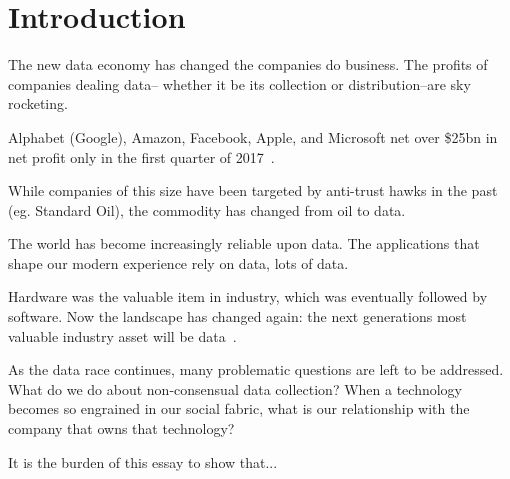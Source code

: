 \section{Introduction}

The new data economy has changed the companies do business. The profits of
companies dealing data-- whether it be its collection or distribution--are sky
rocketing.

Alphabet (Google), Amazon, Facebook, Apple, and Microsoft net over \$25bn in
net profit only in the first quarter of 2017~\cite{economist2017}.

While companies of this size have been targeted by anti-trust hawks in the past
(eg. Standard Oil), the commodity has changed from oil to data.

The world has become increasingly reliable upon data. The applications that
shape our modern experience rely on data, lots of data.

Hardware was the valuable item in industry, which was eventually followed by
software. Now the landscape has changed again: the next generations most
valuable industry asset will be data~\cite{janeway2018doing}.

As the data race continues, many problematic questions are left to be
addressed.  What do we do about non-consensual data collection? When a
technology becomes so engrained in our social fabric, what is our relationship
with the company that owns that technology?

It is the burden of this essay to show that...

